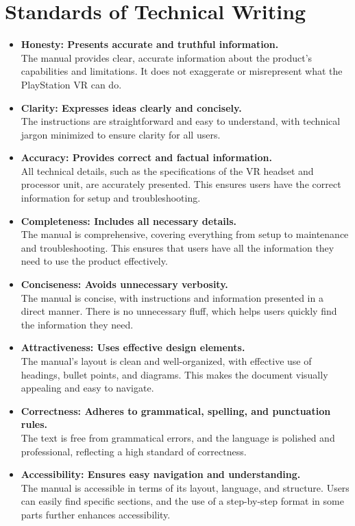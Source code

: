 \documentclass{article}
\begin{document}
\section*{Standards of Technical Writing}

\begin{itemize}
    \item \textbf{Honesty: Presents accurate and truthful information.} \\
    The manual provides clear, accurate information about the product's capabilities and limitations. It does not exaggerate or misrepresent what the PlayStation VR can do.

    \item \textbf{Clarity: Expresses ideas clearly and concisely.} \\
    The instructions are straightforward and easy to understand, with technical jargon minimized to ensure clarity for all users.

    \item \textbf{Accuracy: Provides correct and factual information.} \\
    All technical details, such as the specifications of the VR headset and processor unit, are accurately presented. This ensures users have the correct information for setup and troubleshooting.

    \item \textbf{Completeness: Includes all necessary details.} \\
    The manual is comprehensive, covering everything from setup to maintenance and troubleshooting. This ensures that users have all the information they need to use the product effectively.

    \item \textbf{Conciseness: Avoids unnecessary verbosity.} \\
    The manual is concise, with instructions and information presented in a direct manner. There is no unnecessary fluff, which helps users quickly find the information they need.

    \item \textbf{Attractiveness: Uses effective design elements.} \\
    The manual’s layout is clean and well-organized, with effective use of headings, bullet points, and diagrams. This makes the document visually appealing and easy to navigate.

    \item \textbf{Correctness: Adheres to grammatical, spelling, and punctuation rules.} \\
    The text is free from grammatical errors, and the language is polished and professional, reflecting a high standard of correctness.

    \item \textbf{Accessibility: Ensures easy navigation and understanding.} \\
    The manual is accessible in terms of its layout, language, and structure. Users can easily find specific sections, and the use of a step-by-step format in some parts further enhances accessibility.
\end{itemize}
\end{document}
